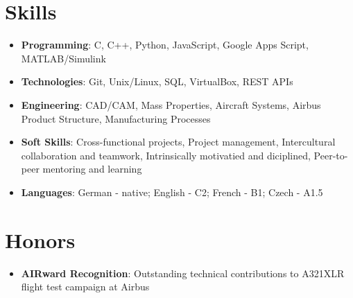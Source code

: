 \documentclass[letterpaper,10pt]{article}
\newcommand{\resumeItem}[2]{
  \item\small{
    \textbf{#1}{: #2 \vspace{-1pt}}
  }
}
\newcommand{\resumeSubItem}[2]{\resumeItem{#1}{#2}\vspace{-1pt}}
\newcommand{\resumeSubHeadingListStartBullets}{\begin{itemize}[leftmargin=*,itemsep=0pt]}
\newcommand{\resumeSubHeadingListEnd}{\end{itemize}}
\begin{document}
\section{Skills}
\resumeSubHeadingListStartBullets
\resumeSubItem{Programming}{C, C++, Python, JavaScript, Google Apps Script, MATLAB/Simulink}
\resumeSubItem{Technologies}{Git, Unix/Linux, SQL, VirtualBox, REST APIs}
\resumeSubItem{Engineering}{CAD/CAM, Mass Properties, Aircraft Systems, Airbus Product Structure, Manufacturing Processes}
\resumeSubItem{Soft Skills}{Cross-functional projects, Project management, Intercultural collaboration and teamwork, Intrinsically motivatied and diciplined, Peer-to-peer mentoring and learning}
\resumeSubItem{Languages}{German - native; English - C2; French - B1; Czech - A1.5}
\resumeSubHeadingListEnd

\section{Honors}
\resumeSubHeadingListStartBullets
\resumeSubItem{AIRward Recognition}{Outstanding technical contributions to A321XLR flight test campaign at Airbus}
\resumeSubHeadingListEnd
\end{document}
